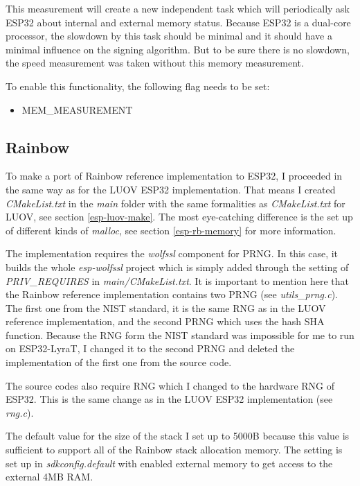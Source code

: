 \documentclass[thesis=M,english]{FITthesis}[2019/12/23]
\begin{document}
\bigskip
\noindent
This measurement will create a new independent task which will periodically ask ESP32 about internal and external memory status. Because ESP32 is a dual-core processor, the slowdown by this task should be minimal and it should have a minimal influence on the signing algorithm. But to be sure there is no slowdown, the speed measurement was taken without this memory measurement.

\bigskip
\noindent
To enable this functionality, the following flag needs to be set:
\begin{itemize}
\item	MEM\_MEASUREMENT
\end{itemize}

\subsection{Rainbow}
To make a port of Rainbow reference implementation to ESP32, I proceeded in the same way as for the LUOV ESP32 implementation. That means I created \textit{CMakeList.txt} in the \textit{main} folder with the same formalities as \textit{CMakeList.txt} for LUOV, see section \ref{esp-luov-make}. The most eye-catching difference is the set up of different kinds of \textit{malloc}, see section \ref{esp-rb-memory} for more information.

\bigskip
\noindent
The implementation requires the \textit{wolfssl} component for PRNG. In this case, it builds the whole \textit{esp-wolfssl} project which is simply added through the setting of \textit{PRIV\_REQUIRES} in \textit{main/CMakeList.txt}.  It is important to mention here that the Rainbow reference implementation contains two PRNG (see \textit{utils\_prng.c}). The first one from the NIST standard, it is the same RNG as in the LUOV reference implementation, and the second PRNG which uses the hash SHA function. Because the RNG form the NIST standard was impossible for me to run on ESP32-LyraT, I changed it to the second PRNG and deleted the implementation of the first one from the source code. 

\bigskip
\noindent
The source codes also require RNG which I changed to the hardware RNG of ESP32. This is the same change as in the LUOV ESP32 implementation (see \textit{rng.c}).

\bigskip
\noindent
The default value for the size of the stack I set up to 5000B because this value is sufficient to support all of the Rainbow stack allocation memory. The setting is set up in \textit{sdkconfig.default} with enabled external memory to get access to the external 4MB RAM. 
\end{document}
